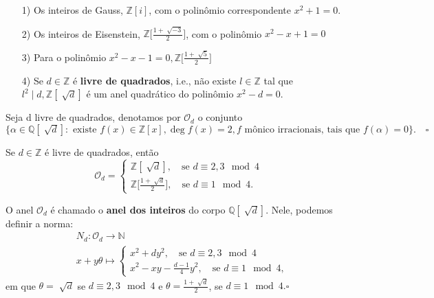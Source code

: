 \documentclass[algebraII_notes.tex]{subfiles}
\begin{document}
\begin{example}
	\begin{itemize}
		\item[1)] Os inteiros de Gauss, \(\mathbb{Z}[i]\), com o polinômio correspondente \(x^{2} + 1 = 0\).
		\item[2)] Os inteiros de Eisenstein, \(\mathbb{Z}\biggl[\frac{1+\sqrt[]{-3}}{2}\biggr]\), com o polinômio \(x^{2} - x + 1 = 0\)
		\item[3)] Para o polinômio \(x^{2} - x - 1 = 0, \mathbb{Z}\biggl[\frac{1 + \sqrt[]{5}}{2}\biggr]\)
		\item[4)] Se \(d\in \mathbb{Z}\) é \textbf{livre de quadrados}, i.e., não existe \(l\in \mathbb{Z}\)
		      tal que \(l^{2}\mid d, \mathbb{Z}[\sqrt[]{d}]\) é um anel quadrático do polinômio \(x^{2} - d = 0.\)
	\end{itemize}
\end{example}
\begin{def*}
	Seja d livre de quadrados, denotamos por \(\mathcal{O}_{d}\) o conjunto
	\(\{\alpha \in \mathbb{Q}[\sqrt[]{d}]:\text{ existe }f(x)\in \mathbb{Z}[x], \deg{f(x)} = 2, f \text{ mônico irracionais, tais que } f(\alpha)=0\}.\quad\square\)
\end{def*}
\begin{theorem*}
	Se \(d\in \mathbb{Z}\) é livre de quadrados, então
	\[
		\mathcal{O}_{d} = \left\{\begin{array}{ll}
			\mathbb{Z}[\sqrt[]{d}],\quad\text{se } d\equiv 2, 3 \mod{4} \\
			\mathbb{Z}\biggl[\frac{1+\sqrt[]{d}}{2}\biggr],\quad\text{se } d\equiv 1\mod{4}.
		\end{array}\right.
	\]
\end{theorem*}
\begin{def*}
	O anel \(\mathcal{O}_{d}\) é chamado o \textbf{anel dos inteiros} do corpo \(\mathbb{Q}[\sqrt[]{d}].\) Nele,
	podemos definir a norma:
	\begin{align*}
		 & N_{d}:\mathcal{O}_{d}\rightarrow \mathbb{N}                                              \\
		 & x+y\theta \mapsto \left\{\begin{array}{ll}
			                            x^{2} + dy^{2},\quad \text{se } d\equiv2,3\mod{4} \\
			                            x^{2} - xy - \frac{d-1}{4}y^{2},\quad\text{se } d\equiv1\mod{4},
		                            \end{array}\right.
	\end{align*}
	em que \(\theta = \sqrt[]{d}\) se \(d\equiv 2, 3\mod{4}\) e \(\theta = \frac{1+\sqrt[]{d}}{2}\), se \(d\equiv 1\mod{4}.\square\)
\end{def*}
\end{document}
